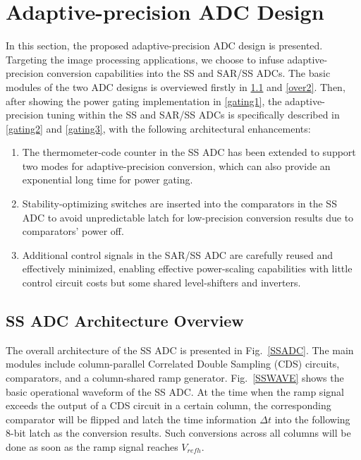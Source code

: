 \section{Adaptive-precision ADC Design}\label{architecture}

In this section, the proposed adaptive-precision ADC design is presented. Targeting the image processing applications, we choose to infuse adaptive-precision conversion capabilities into the SS and SAR/SS ADCs. The basic modules of the two ADC designs is overviewed firstly in \ref{over1} and \ref{over2}. Then, after showing the power gating implementation in \ref{gating1}, the adaptive-precision tuning within the SS and SAR/SS ADCs is specifically described in \ref{gating2} and \ref{gating3}, with the following architectural enhancements:

\begin{enumerate}[\IEEEsetlabelwidth{3)}]
	\item 
	The thermometer-code counter in the SS ADC has been extended to support two modes for adaptive-precision conversion, which can also provide an exponential long time for power gating.
	\item
    Stability-optimizing switches are inserted into the comparators in the SS ADC to avoid unpredictable latch for low-precision conversion results due to comparators' power off. 
    \item
    Additional control signals in the SAR/SS ADC are carefully reused and effectively minimized, enabling effective power-scaling capabilities with little control circuit costs but some shared level-shifters and inverters.      
\end{enumerate} 



\subsection{SS ADC Architecture Overview}\label{over1}

The overall architecture of the SS ADC is presented in Fig.~\ref{SSADC}. The main modules include column-parallel Correlated Double Sampling (CDS) circuits, comparators, 
and a column-shared ramp generator. Fig.~\ref{SSWAVE} shows the basic operational waveform of the SS ADC. At the time when the ramp signal exceeds the output of a CDS circuit in a certain column, 
the corresponding comparator will be flipped and latch the time information $\Delta t$ into the following 8-bit latch as the conversion results. 
Such conversions across all columns will be done as soon as the ramp signal reaches $V_{refh}$.

